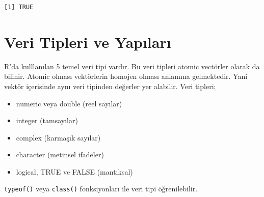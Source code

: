 \documentclass[
  letterpaper,
  DIV=11,
  numbers=noendperiod]{scrreprt}
\begin{document}
\begin{verbatim}
[1] TRUE
\end{verbatim}

\hypertarget{veri-tipleri-ve-yapux131larux131}{%
\chapter{Veri Tipleri ve
Yapıları}\label{veri-tipleri-ve-yapux131larux131}}

R'da kulllanılan 5 temel veri tipi vardır. Bu veri tipleri atomic
vectörler olarak da bilinir. Atomic olması vektörlerin homojen olması
anlamına gelmektedir. Yani vektör içerisinde aynı veri tipinden değerler
yer alabilir. Veri tipleri;

\begin{itemize}
\item
  numeric veya double (reel sayılar)
\item
  integer (tamsayılar)
\item
  complex (karmaşık sayılar)
\item
  character (metinsel ifadeler)
\item
  logical, TRUE ve FALSE (mantıksal)
\end{itemize}

\texttt{typeof()} veya \texttt{class()} fonksiyonları ile veri tipi
öğrenilebilir.
\end{document}
